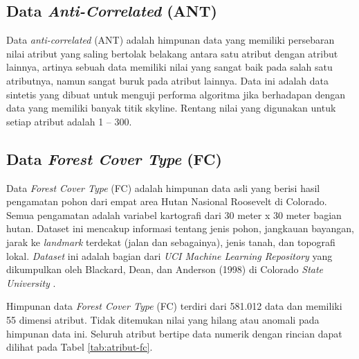 \subsection{Data \textit{Anti-Correlated} (ANT)}
\tab Data \textit{anti-correlated} (ANT) adalah himpunan data yang memiliki
persebaran nilai atribut yang saling bertolak belakang antara satu
atribut dengan atribut lainnya, artinya sebuah data memiliki
nilai yang sangat baik pada salah satu atributnya, namun sangat
buruk pada atribut lainnya. Data ini adalah data sintetis yang dibuat untuk menguji performa algoritma jika berhadapan dengan data yang memiliki banyak titik skyline. Rentang nilai yang digunakan untuk setiap
atribut adalah 1 – 300.

\subsection{Data \textit{Forest Cover Type} (FC)}
\tab Data \textit{Forest Cover Type} (FC) adalah himpunan data asli yang berisi hasil pengamatan pohon dari empat area Hutan Nasional Roosevelt di Colorado. Semua pengamatan adalah variabel kartografi dari 30 meter x 30 meter bagian hutan. Dataset ini mencakup informasi tentang jenis pohon, jangkauan bayangan, jarak ke \textit{landmark} terdekat (jalan dan sebagainya), jenis tanah, dan topografi lokal. \textit{Dataset} ini adalah bagian dari \textit{UCI Machine Learning Repository} yang dikumpulkan oleh Blackard, Dean, dan Anderson (1998) di Colorado \textit{State University} \cite{fc}.

\pagebreak
Himpunan data \textit{Forest Cover Type} (FC) terdiri dari 581.012 data dan memiliki 55 dimensi atribut. Tidak ditemukan nilai yang hilang atau anomali
pada himpunan data ini. Seluruh atribut bertipe data numerik
dengan rincian dapat dilihat pada Tabel \ref{tab:atribut-fc}.

